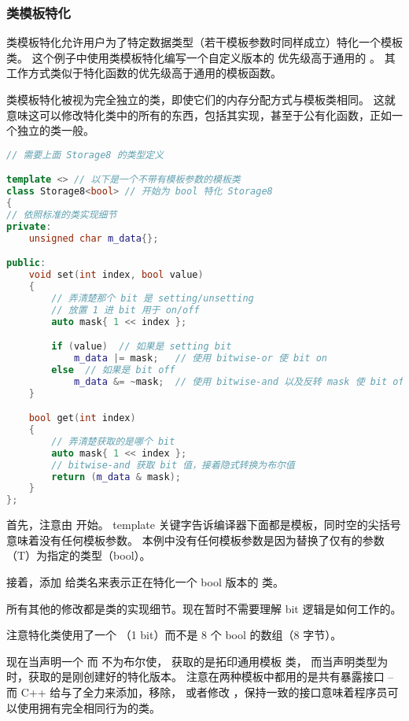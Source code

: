 \documentclass[../../LearnCpp.tex]{subfiles}
\begin{document}
\subsubsection*{类模板特化}

类模板特化允许用户为了特定数据类型（若干模板参数时同样成立）特化一个模板类。
这个例子中使用类模板特化编写一个自定义版本的  优先级高于通用的 。
其工作方式类似于特化函数的优先级高于通用的模板函数。

类模板特化被视为完全独立的类，即使它们的内存分配方式与模板类相同。
这就意味这可以修改特化类中的所有的东西，包括其实现，甚至于公有化函数，正如一个独立的类一般。

\begin{lstlisting}[language=C++]
// 需要上面 Storage8 的类型定义

template <> // 以下是一个不带有模板参数的模板类
class Storage8<bool> // 开始为 bool 特化 Storage8
{
// 依照标准的类实现细节
private:
    unsigned char m_data{};

public:
    void set(int index, bool value)
    {
        // 弄清楚那个 bit 是 setting/unsetting
        // 放置 1 进 bit 用于 on/off
        auto mask{ 1 << index };

        if (value)  // 如果是 setting bit
            m_data |= mask;   // 使用 bitwise-or 使 bit on
        else  // 如果是 bit off
            m_data &= ~mask;  // 使用 bitwise-and 以及反转 mask 使 bit off
    }

    bool get(int index)
    {
        // 弄清楚获取的是哪个 bit
        auto mask{ 1 << index };
        // bitwise-and 获取 bit 值，接着隐式转换为布尔值
        return (m_data & mask);
    }
};
\end{lstlisting}

首先，注意由  开始。
template 关键字告诉编译器下面都是模板，同时空的尖括号意味着没有任何模板参数。
本例中没有任何模板参数是因为替换了仅有的参数（T）为指定的类型（bool）。

接着，添加  给类名来表示正在特化一个 bool 版本的  类。

所有其他的修改都是类的实现细节。现在暂时不需要理解 bit 逻辑是如何工作的。

注意特化类使用了一个 （1 bit）而不是 8 个 bool 的数组（8 字节）。

现在当声明一个  而  不为布尔使，
获取的是拓印通用模板  类，
而当声明类型为  时，获取的是刚创建好的特化版本。
注意在两种模板中都用的是共有暴露接口 -- 而 C++ 给与了全力来添加，移除，
或者修改 ，保持一致的接口意味着程序员可以使用拥有完全相同行为的类。
\end{document}
